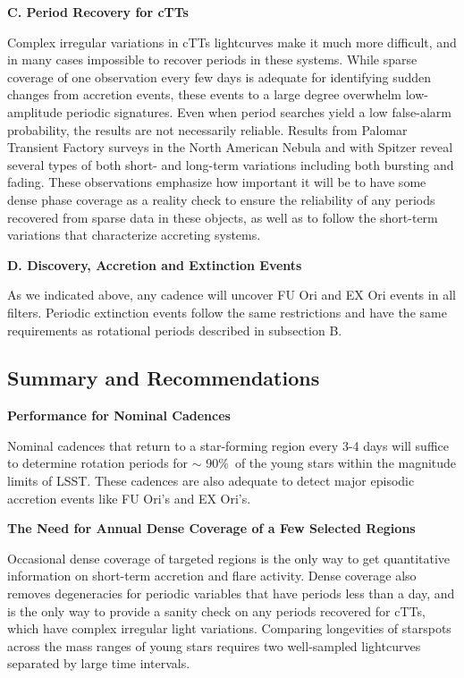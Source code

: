 \bf{C. Period Recovery for cTTs}

Complex irregular variations in cTTs lightcurves make it much more difficult,
and in many cases impossible to
recover periods in these systems. While sparse coverage of one observation every
few days is adequate for identifying sudden changes from accretion events, these
events to a large degree overwhelm low-amplitude periodic signatures. Even when
period searches yield a low false-alarm probability, the results are not necessarily
reliable. Results from Palomar Transient Factory surveys in the North American
Nebula \citep[(Findeisen et al. 2013)]{feindeisen13} and with Spitzer
\citep[(Cody et al. 2014)]{cody14} 
reveal several types of both short- and long-term variations including both bursting and
fading.  These observations emphasize how important it will be to have some
dense phase coverage as a reality check to ensure the reliability of
any periods recovered from sparse data in these objects, as well as to
follow the short-term variations that characterize accreting systems.

\bf{D. Discovery, Accretion and Extinction Events}

As we indicated above, any
cadence will uncover FU Ori and EX Ori events in all filters.
Periodic extinction events follow the same restrictions and
have the same requirements as rotational periods described in subsection B.



\subsection{Summary and Recommendations}
\label{sec:\secname:discussion}

\bf{Performance for Nominal Cadences}

Nominal cadences that return to a star-forming region every 3-4 days
will suffice to determine rotation periods for $\sim$ 90\%\ of the 
young stars within the magnitude limits of LSST. 
These cadences are also adequate to detect major episodic
accretion events like FU Ori's and EX Ori's.

\bf{The Need for Annual Dense Coverage of a Few Selected Regions}

Occasional dense coverage of targeted regions is the only way to
get quantitative information on short-term accretion and flare
activity.  Dense coverage also removes degeneracies
for periodic variables that have periods less than a day, and is
the only way to provide a sanity check on any periods recovered for
cTTs, which have complex irregular light variations.
Comparing longevities of starspots across the mass ranges of young
stars requires two well-sampled lightcurves separated by large
time intervals. 

